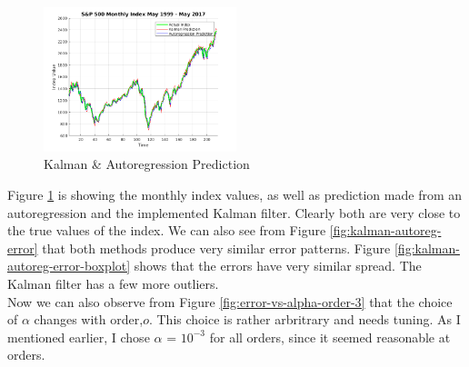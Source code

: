 \documentclass[11pt, fleqn]{article}
\begin{document}
\begin{figure}
	\vspace{-1cm}
  	\centering
  	\includegraphics[width=0.5\textwidth]{kalman-autoreg-pred.png}
	\caption{Kalman \& Autoregression Prediction}
	\label{fig:kalman-autoreg-pred}
\end{figure}

Figure \ref{fig:kalman-autoreg-pred} is showing the monthly index values, as well as prediction made from an autoregression and the implemented Kalman filter. Clearly both are very close to the true values of the index. We can also see from Figure \ref{fig:kalman-autoreg-error} that both methods produce very similar error patterns. Figure \ref{fig:kalman-autoreg-error-boxplot} shows that the errors have very similar spread. The Kalman filter has a few more outliers.\\

Now we can also observe from Figure \ref{fig:error-vs-alpha-order-3} that the choice of $\alpha$ changes with order,$o$. This choice is rather arbritrary and needs tuning. As I mentioned earlier, I chose $\alpha$ = $10^{-3}$ for all orders, since it seemed reasonable at orders.
\end{document}
